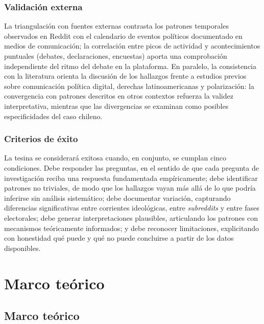 \documentclass[
  letterpaper,
  numbers=noendperiod,
  fontsize=11pt,
  DIV=12,
  titlepage=false]{scrreprt}
\begin{document}
\subsection{Validación externa}\label{validaciuxf3n-externa}

La triangulación con fuentes externas contrasta los patrones temporales
observados en Reddit con el calendario de eventos políticos documentado
en medios de comunicación; la correlación entre picos de actividad y
acontecimientos puntuales (debates, declaraciones, encuestas) aporta una
comprobación independiente del ritmo del debate en la plataforma. En
paralelo, la consistencia con la literatura orienta la discusión de los
hallazgos frente a estudios previos sobre comunicación política digital,
derechas latinoamericanas y polarización: la convergencia con patrones
descritos en otros contextos refuerza la validez interpretativa,
mientras que las divergencias se examinan como posibles especificidades
del caso chileno.

\subsection{Criterios de éxito}\label{criterios-de-uxe9xito}

La tesina se considerará exitosa cuando, en conjunto, se cumplan cinco
condiciones. Debe responder las preguntas, en el sentido de que cada
pregunta de investigación reciba una respuesta fundamentada
empíricamente; debe identificar patrones no triviales, de modo que los
hallazgos vayan más allá de lo que podría inferirse sin análisis
sistemático; debe documentar variación, capturando diferencias
significativas entre corrientes ideológicas, entre \emph{subreddits} y
entre fases electorales; debe generar interpretaciones plausibles,
articulando los patrones con mecanismos teóricamente informados; y debe
reconocer limitaciones, explicitando con honestidad qué puede y qué no
puede concluirse a partir de los datos disponibles.


\chapter{Marco teórico}\label{marco-teuxf3rico}

\section{Marco teórico}\label{marco-teuxf3rico-1}
\end{document}
